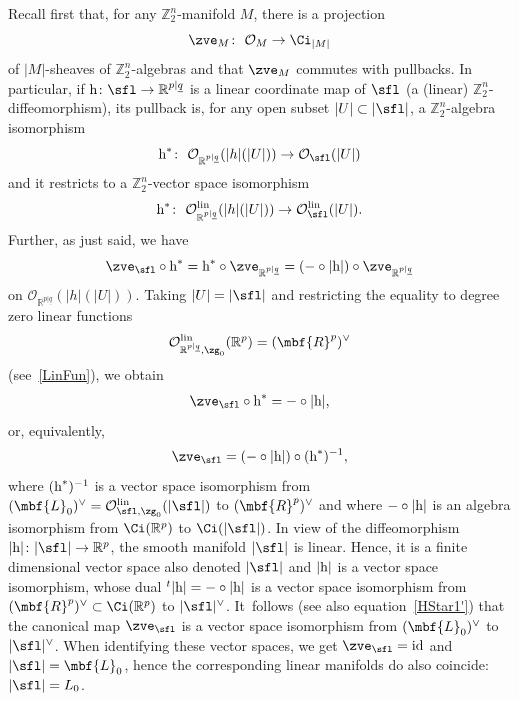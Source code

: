 \documentclass[10pt,a4paper]{amsart}
\newcommand{\rmh}{\textnormal{h}}
\newcommand{\op}[1]{\operatorname{#1}}
\newcommand{\R}{{\mathbb R}}
\newcommand{\Z}{{\mathbb Z}}
\def\ul{\underline}
\def\cO{\mathcal{O}}
\def\ul{\underline}
\newcommand{\0}{\otimes}
\newcommand{\id}{\op{id}}
\newcommand{\z}{\Z_2^n}
\numberwithin{equation}{section}
\begin{document}
Recall first that, for any $\z$-manifold $M$, there is a projection
\[
\zve_M\colon\ \cO_{M}\to\Ci_{|M|}
\]
of $|M|$-sheaves of $\z$-algebras and that $\zve_M$ commutes with pullbacks. In particular, if $\rmh\colon \sfl\to\R^{p|\ul q}$ is a linear coordinate map of $\sfl$ (a (linear) $\z$-diffeomorphism), its pullback is, for any open subset $|U|\subset|\sfl|$, a $\z$-algebra isomorphism
\[
\rmh^*\colon\ \cO_{\R^{p|\ul q}}(|h|(|U|))\to \cO_\sfl(|U|)
\]
and it restricts to a $\z$-vector space isomorphism
\[
\rmh^*\colon\ \cO^{\op{lin}}_{\R^{p|\ul q}}(|h|(|U|))\to \cO^{\op{lin}}_\sfl(|U|).
\]
Further, as just said, we have
\[
\zve_\sfl\circ \rmh^*=\rmh^*\circ\zve_{\R^{p|\ul q}}=(-\circ|\rmh|)\circ\zve_{\R^{p|\ul q}}
\]
on $\cO_{\R^{p|\ul q}}(|h|(|U|))$. Taking $|U|=|\sfl|$ and restricting the equality to degree zero linear functions
\[
\cO_{\R^{p|\ul q},\zg_0}^{\op{lin}}(\R^p)=(\mbf{R}^{p})^\vee
\]
(see~\eqref{LinFun}), we obtain
\begin{gather}\label{HStar1}
\zve_\sfl\circ\rmh^*=-\circ|\rmh|,
\end{gather}
or, equivalently,
\begin{gather}\label{HStar1'}
\zve_\sfl=(-\circ|\rmh|)\circ(\rmh^*)^{-1},
\end{gather}
where $(\rmh^*)^{-1}$ is a vector space isomorphism from $(\mbf{L}_0)^\vee=\cO_{\sfl,\zg_0}^{\op{lin}}(|\sfl|)$ to $(\mbf{R}^p)^\vee$ and where $-\circ|\rmh|$ is an algebra isomorphism from $\Ci(\R^p)$ to $\Ci(|\sfl|)$. In view of the diffeomorphism $|\rmh|\colon |\sfl|\to \R^p$, the smooth manifold $|\sfl|$ is linear. Hence, it is a finite dimensional vector space also denoted $|\sfl|$ and $|\rmh|$ is a vector space isomorphism, whose dual $^t|\rmh|=-\circ|\rmh|$ is a vector space isomorphism from $(\mbf{R}^p)^\vee\subset\Ci(\R^p)$ to $|\sfl|^{\vee}$. It~follows (see also equation~\eqref{HStar1'}) that the canonical map $\zve_\sfl$ is a vector space isomorphism from $(\mbf{L}_0)^\vee$ to $|\sfl|^\vee$. When identifying these vector spaces, we get $\zve_\sfl=\id$ and $|\sfl|=\mbf{L}_0$, hence the corresponding linear manifolds do also coincide: $|\sfl|=L_0$.
\end{document}
